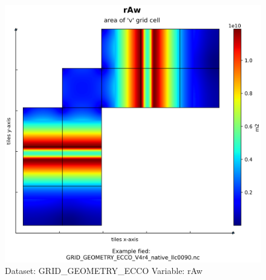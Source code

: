 \begin{figure}[H]
\centering
\includegraphics[width=\textwidth]{../images/plots/native_plots_coords/Geometry_Parameters_for_the_Lat-Lon-Cap_90_(llc90)_Native_Model_Grid_(Version_4_Release_4)/rAw.png}
\caption{Dataset: GRID\_GEOMETRY\_ECCO Variable: rAw}
\label{tab:table-GRID_GEOMETRY_ECCO_rAw-Plot}
\end{figure}
\pagebreak
